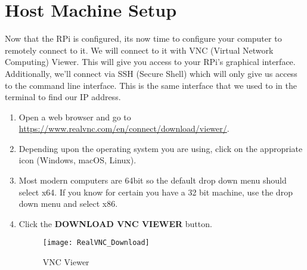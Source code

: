 \documentclass[
a4paper,
fontsize=14pt, %
pagesize, %
parskip=half-, %
]{scrartcl} %
\theoremstyle{mythmstyle} %
\begin{document}
\section{Host Machine Setup}
Now that the RPi is configured, its now time to configure your computer to remotely connect to it.  We will connect to it with VNC (Virtual Network Computing) Viewer.  This will give you access to your RPi's graphical interface.  Additionally, we'll connect via SSH (Secure Shell) which will only give us access to the command line interface.  This is the same interface that we used to in the terminal to find our IP address.
\begin{enumerate}
    \item Open a web browser and go to \url{https://www.realvnc.com/en/connect/download/viewer/}.
    \item Depending upon the operating system you are using, click on the appropriate icon (Windows, macOS, Linux).
    \item Most modern computers are 64bit so the default drop down menu should select x64.  If you know for certain you have a 32 bit machine, use the drop down menu and select x86.
    \item Click the \textbf{DOWNLOAD VNC VIEWER} button.
    \begin{figure}[h]
        \centering\texttt{[image: RealVNC\_Download]}
        \caption{VNC Viewer}
    \end{figure}
\end{enumerate}

\clearpage
\end{document}
